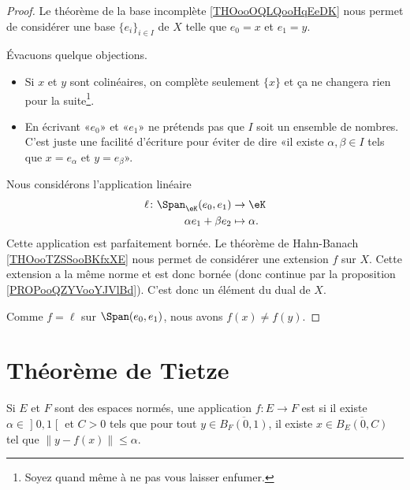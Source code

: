 \begin{proof}
    Le théorème de la base incomplète \ref{THOooOQLQooHqEeDK} nous permet de considérer une base \( \{ e_i \}_{i\in I}\) de \( X\) telle que \( e_0=x\) et \( e_1=y\).

    Évacuons quelque objections.
    \begin{itemize}
        \item Si \( x\) et \( y\) sont colinéaires, on complète seulement \( \{ x \}\) et ça ne changera rien pour la suite\footnote{Soyez quand même  à ne pas vous laisser enfumer.}.
        \item En écrivant «\( e_0\)» et «\( e_1\)»  ne prétends pas que \( I\) soit un ensemble de nombres. C'est juste une facilité d'écriture pour éviter de dire «il existe \( \alpha,\beta\in I\) tels que \( x=e_{\alpha}\) et \( y=e_{\beta}\)».
    \end{itemize}
    Nous considérons l'application linéaire
    \begin{equation}
        \begin{aligned}
            \ell\colon \Span_{\eK}(e_0,e_1) & \to \eK         \\
            \alpha e_1+\beta e_2            & \mapsto \alpha.
        \end{aligned}
    \end{equation}
    Cette application est parfaitement bornée. Le théorème de Hahn-Banach \ref{THOooTZSSooBKfxXE} nous permet de considérer une extension \( f\) sur \( X\). Cette extension a la même norme et est donc bornée (donc continue par la proposition \ref{PROPooQZYVooYJVlBd}). C'est donc un élément du dual de \( X\).

    Comme \( f=\ell\) sur \( \Span(e_0,e_1)\), nous avons \( f(x)\neq f(y)\).
\end{proof}

\section{Théorème de Tietze}

\begin{definition}
    Si \( E\) et \( F\) sont des espaces normés, une application \( f\colon E\to F\) est  si il existe \( \alpha\in\mathopen] 0 , 1 \mathclose[\) et \( C>0\) tels que pour tout \( y\in \overline{ B_F(0,1) }\), il existe \( x\in\overline{ B_E(0,C) }\) tel que \( \| y-f(x) \|\leq \alpha\).
\end{definition}


